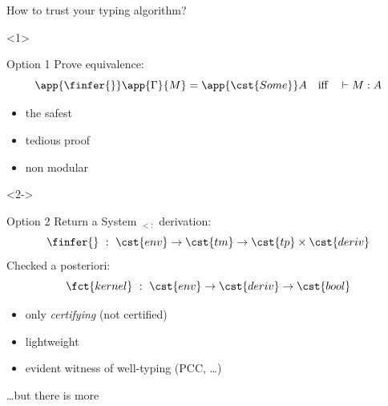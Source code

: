 \begin{frame}{How to trust your typing algorithm?}
  \begin{onlyenv}<1>
    \begin{block}{Option 1}
      Prove equivalence:
    $$
    \app{\finfer{}}\app{\Gamma}{M}=\app{\cst{Some}} A
    \quad\text{iff}\quad \vdash M : A
    $$
    \begin{itemize}
    \item[\itplus] the safest
    \item[\itminus] tedious proof
    \item[\itminus] non modular
    \end{itemize}
  \end{block}
\end{onlyenv}
\begin{onlyenv}<2->
  \begin{block}{Option 2}
    Return a System $_{<:}$ derivation:
    $$
    \finfer{}\ :\ \cst{env}\to\cst{tm}\to\cst{tp}\times\cst{deriv}
    $$
    \pause
    Checked a posteriori:
    $$
    \fct{kernel}\ :\ \cst{env}\to\cst{deriv}\to\cst{bool}
    $$
    \begin{itemize}
    \item[\itminus] only \emph{certifying} (not certified)
    \item[\itplus] lightweight
    \item[\itplus] evident witness of well-typing (PCC, \ldots)
    \end{itemize}
    \pause
    \flushright \ldots but there is more
  \end{block}
\end{onlyenv}
\end{frame}

